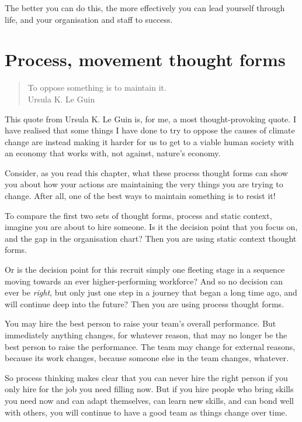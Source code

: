 The better you can do this, the more effectively you can lead yourself through life, and your organisation and staff to success.






\section{Process, movement thought forms}
\begin{quote}
To oppose something is to maintain it.\\
\raggedleft\textemdash Ursula K. Le Guin 
\end{quote}


This quote from Ursula K. Le Guin is, for me, a most thought-provoking quote. I have realised that some things I have done to try to oppose the causes of climate change are instead making it harder for us to get to a viable human society with an economy that works with, not against, nature's economy.


Consider, as you read this chapter, what these process thought forms can show you about how your actions are maintaining the very things you are trying to change. After all, one of the best ways to maintain something is to resist it!


To compare the first two sets of thought forms, process and static context, imagine you are about to hire someone. Is it the decision point that you focus on, and the gap in the organisation chart? Then you are using static context thought forms. 


Or is the decision point for this recruit simply one fleeting stage in a sequence moving towards an ever higher-performing workforce? And so no decision can ever be \emph{right}, but only just one step in a journey that began a long time ago, and will continue deep into the future? Then you are using process thought forms.


You may hire the best person to raise your team's overall performance. But immediately anything changes, for whatever reason, that may no longer be the best person to raise the performance. The team may change for external reasons, because its work changes, because someone else in the team changes, whatever. 


So process thinking makes clear that you can never hire the right person if you only hire for the job you need filling now. But if you hire people who bring skills you need now and can adapt themselves, can learn new skills, and can bond well with others, you will continue to have a good team as things change over time.


